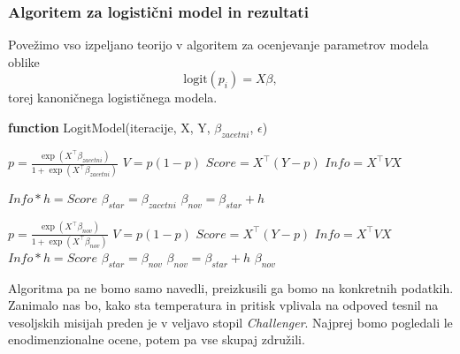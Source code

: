 \documentclass[12pt,a4paper]{amsart}
\theoremstyle{definition} %
\theoremstyle{plain} %
\begin{document}
\subsubsection{Algoritem za logistični model in rezultati}
Povežimo vso izpeljano teorijo v algoritem za ocenjevanje parametrov modela oblike
\[
    \mathrm{logit}(p_{i}) = X\beta,
\]
torej kanoničnega logističnega modela.
\begin{algorithm}[H]
    \caption{\textbf{function} LogitModel(iteracije, X, Y, $\beta_{zacetni}$, $\epsilon$)}
\begin{algorithmic}
    
    \STATE $p = \frac{\exp{(X^\top \beta_{zacetni})}}{1 + \exp{(X^\top \beta_{zacetni})}}$
    \STATE $V = p(1 - p)$ 
    \STATE $Score = X^\top (Y - p)$ 
    \STATE $Info = X^\top V X$ 
    
    \STATE {} $Info * h = Score$
    \STATE $\beta_{star} = \beta_{zacetni}$
    \STATE $\beta_{nov} = \beta_{star} + h$
        
            \STATE $p = \frac{\exp{(X^\top \beta_{nov})}}{1 + \exp{(X^\top \beta_{nov})}}$ 
            \STATE $V = p(1 - p)$ 
            \STATE $Score = X^\top (Y - p)$ 
            \STATE $Info = X^\top V X$ 
            \STATE {}
            \STATE $Info * h = Score$ 
            \STATE $\beta_{star} = \beta_{nov}$ 
            \STATE $\beta_{nov} = \beta_{star} + h$ 
        \ELSE
        \STATE {}
        \RETURN $\beta_{nov}$
        \ENDIF
        
    \ENDWHILE
\end{algorithmic}
\end{algorithm}

Algoritma pa ne bomo samo navedli, preizkusili ga bomo na konkretnih podatkih. Zanimalo nas bo, kako sta temperatura in pritisk vplivala na odpoved
tesnil na vesoljskih misijah preden je v veljavo stopil \textit{Challenger}. Najprej bomo pogledali le enodimenzionalne ocene, potem pa vse skupaj združili.
\end{document}
